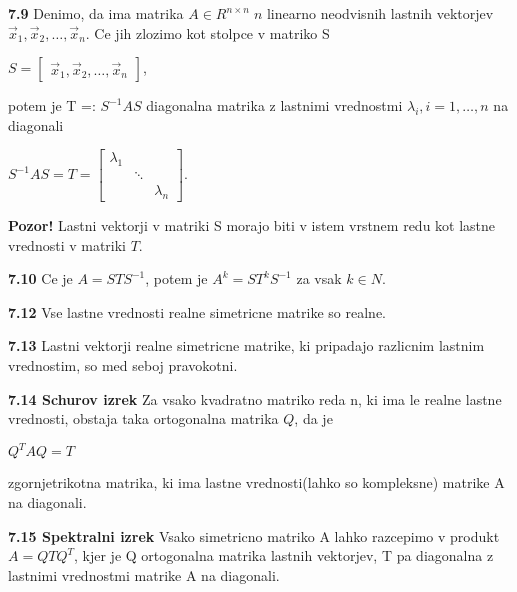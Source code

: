 \documentclass{article}
\begin{document}
\begin{multicols}{2}
\textbf{7.9} Denimo, da ima matrika $A \in R^{n \times n}\; n$ linearno neodvisnih lastnih vektorjev
$\vec{x}_{1}, \vec{x}_{2}, \dots, \vec{x}_{n}$. Ce jih zlozimo kot stolpce v matriko S
\begin{center}
    \begin{math}
        S =
        \begin{bmatrix}
            \vec{x}_{1}, \vec{x}_{2}, \dots, \vec{x}_{n}
        \end{bmatrix}
    \end{math},
\end{center}
potem je T =: $S^{-1}AS$ diagonalna matrika z lastnimi vrednostmi $\lambda_{i}, i = 1, \dots, n$ na diagonali
\begin{center}
    \begin{math}
        S^{-1}AS = T =
        \begin{bmatrix}
            \lambda_{1} & &\\
            &   \ddots  &  \\
            & &     \lambda_{n} 
        \end{bmatrix}
    \end{math}.
\end{center}

\textbf{Pozor!} Lastni vektorji v matriki S morajo biti v istem vrstnem redu kot lastne vrednosti v matriki $T$.

\textbf{7.10} Ce je $A = STS^{-1}$, potem je $A^{k} = ST^{k}S^{-1}$ za vsak $k \in N$.

\textbf{7.12} Vse lastne vrednosti realne simetricne matrike so realne.

\textbf{7.13} Lastni vektorji realne simetricne matrike, ki pripadajo razlicnim lastnim
vrednostim, so med seboj pravokotni.

\textbf{7.14 Schurov izrek} Za vsako kvadratno matriko reda n, ki ima le realne lastne vrednosti,
obstaja taka ortogonalna matrika $Q$, da je 
\begin{center}
    \begin{math}
        Q^{T}AQ = T
    \end{math}
\end{center} 
zgornjetrikotna matrika, ki ima lastne vrednosti(lahko so kompleksne) matrike A na diagonali.

\textbf{7.15 Spektralni izrek} Vsako simetricno matriko A lahko razcepimo v produkt
$A = QTQ^{T}$, kjer je Q ortogonalna matrika lastnih vektorjev, T pa diagonalna z lastnimi
vrednostmi matrike A na diagonali.


\end{multicols}
\end{document}
